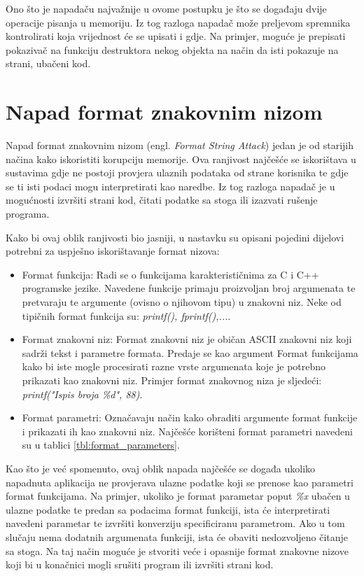 \documentclass[times, utf8, diplomski, numeric]{fer}
\begin{document}
Ono što je napadaču najvažnije u ovome postupku je što se
događaju dvije operacije pisanja u memoriju. Iz tog razloga
napadač može preljevom spremnika kontrolirati koja vrijednost će
se upisati i gdje. Na primjer, moguće je prepisati pokazivač na
funkciju destruktora nekog objekta na način da isti pokazuje na
strani, ubačeni kod.

\section{Napad format znakovnim nizom}

Napad format znakovnim nizom (engl. \emph{Format String Attack}) 
jedan je od starijih načina kako iskoristiti korupciju memorije.
Ova ranjivost najčešće se iskorištava u sustavima gdje ne postoji
provjera ulaznih podataka od strane korisnika te gdje se ti isti
podaci mogu interpretirati kao naredbe. Iz tog razloga napadač je
u mogućnosti izvršiti strani kod, čitati podatke sa stoga ili
izazvati rušenje programa. 

Kako bi ovaj oblik ranjivosti bio jasniji, u nastavku su opisani
pojedini dijelovi potrebni za uspješno iskorištavanje format
nizova:

\begin{itemize}
\item Format funkcija: Radi se o funkcijama karakterističnima za
C i C++ programske jezike. Navedene funkcije primaju proizvoljan
broj argumenata te pretvaraju te argumente (ovisno o njihovom
tipu) u znakovni niz. Neke od tipičnih format funkcija su:
\emph{printf(), fprintf(),...}. 

\item Format znakovni niz: Format znakovni niz je običan ASCII
znakovni niz koji sadrži tekst i parametre formata. Predaje se
kao argument Format funkcijama kako bi iste mogle procesirati				%
razne vrste argumenata koje je potrebno prikazati kao znakovni
niz. Primjer format znakovnog niza je sljedeći:
\emph{printf("Ispis broja \%d", 88)}.

\item Format parametri: Označavaju način kako obraditi argumente
format funkcije i prikazati ih kao znakovni niz. Najčešće
korišteni format parametri navedeni su u tablici 					%
\ref{tbl:format_parameters}.
\end{itemize}

Kao što je već spomenuto, ovaj oblik napada najčešće se događa
ukoliko napadnuta aplikacija ne provjerava ulazne podatke koji se
prenose kao parametri format funkcijama. Na primjer, ukoliko je
format parametar poput \emph{\%x} ubačen u ulazne podatke te
predan sa podacima format funkciji, ista će interpretirati
navedeni parametar te izvršiti konverziju specificiranu
parametrom. Ako u tom slučaju nema dodatnih argumenata funkciji,
ista će obaviti nedozvoljeno čitanje sa stoga. Na taj način
moguće je stvoriti veće i opasnije format znakovne nizove koji bi
u konačnici mogli srušiti program ili izvršiti strani kod.				%
\end{document}
